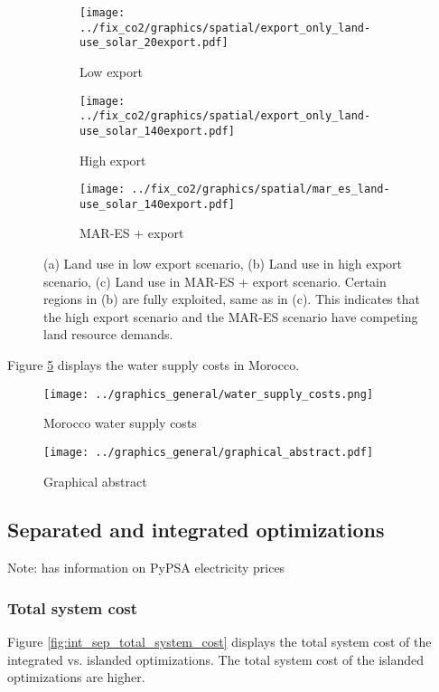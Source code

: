 \begin{figure}[h]
    \centering
    \begin{subfigure}[b]{0.3\textwidth}
        \texttt{[image: ../fix\_co2/graphics/spatial/export\_only\_land-use\_solar\_20export.pdf]}
        \caption{Low export}
        \label{fig:graphic1}
    \end{subfigure}
    \begin{subfigure}[b]{0.3\textwidth}
        \texttt{[image: ../fix\_co2/graphics/spatial/export\_only\_land-use\_solar\_140export.pdf]}
        \caption{High export}
        \label{fig:graphic2}
    \end{subfigure}
    \begin{subfigure}[b]{0.3\textwidth}
        \texttt{[image: ../fix\_co2/graphics/spatial/mar\_es\_land-use\_solar\_140export.pdf]}
        \caption{MAR-ES + export}
        \label{fig:graphic3}
    \end{subfigure}
    \caption{(a) Land use in low export scenario, (b) Land use in high export scenario, (c) Land use in MAR-ES + export scenario. Certain regions in
    (b) are fully exploited, same as in (c). This indicates that the high export scenario and the MAR-ES scenario have competing land resource demands.}
    \label{fig:land_use_solar}
\end{figure}
    
Figure \ref{fig:morocco_water} displays the water supply costs in Morocco.

\begin{figure}[h!]
    \centering
    \texttt{[image: ../graphics\_general/water\_supply\_costs.png]}
    \caption{Morocco water supply costs}
    \label{fig:morocco_water}
\end{figure}


\begin{figure}[h!]
    \centering
    \texttt{[image: ../graphics\_general/graphical\_abstract.pdf]}
    \caption{Graphical abstract}
    \label{fig:graphical_abstract}
\end{figure}

\subsection{Separated and integrated optimizations}
\label{subsec: sep_int_opti}

Note: \cite{Zeyen2022} has information on PyPSA electricity prices

\subsubsection{Total system cost}
Figure \ref{fig:int_sep_total_system_cost} displays the total system cost
of the integrated vs. islanded optimizations. The total system cost of the
islanded optimizations are higher.

